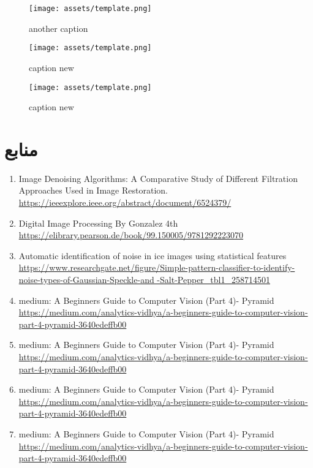 \documentclass[a4paper,12pt]{article}
\begin{document}
	\begin{figure}[ht]
		\centering
		\begin{minipage}[t]{0.32\textwidth}
			\centering
			\texttt{[image: assets/template.png]}
			\caption{\textcolor{CustomAccent}{another caption}}
		\end{minipage}
		\hfill
		\begin{minipage}[t]{0.32\textwidth}
			\centering
			\texttt{[image: assets/template.png]}
			\caption{\textcolor{CustomAccent}{caption new}}
		\end{minipage}
		\vspace{1em}
		\hfill
		\begin{minipage}[t]{0.32\textwidth}
			\centering
			\texttt{[image: assets/template.png]}
			\caption{\textcolor{CustomAccent}{caption new}}
		\end{minipage}
		\vspace{1em}
	\end{figure}
	
	
	
\clearpage
\section*{منابع}

\begin{LTR}
	\begin{latin}
		\begin{enumerate}[left=0pt,labelsep=5pt,itemsep=0pt,parsep=0pt,topsep=0pt]
			\item Image Denoising Algorithms: A Comparative Study of Different Filtration Approaches Used in Image Restoration.  \url{https://ieeexplore.ieee.org/abstract/document/6524379/}
			\item Digital Image Processing By Gonzalez 4th  \url{https://elibrary.pearson.de/book/99.150005/9781292223070}
			\item Automatic identification of noise in ice images using statistical features \url{https://www.researchgate.net/figure/Simple-pattern-classifier-to-identify-noise-types-of-Gaussian-Speckle-and -Salt-Pepper_tbl1_258714501}
			\item medium: A Beginners Guide to Computer Vision (Part 4)- Pyramid \url{https://medium.com/analytics-vidhya/a-beginners-guide-to-computer-vision-part-4-pyramid-3640edeffb00}
			
			
			\item medium: A Beginners Guide to Computer Vision (Part 4)- Pyramid \url{https://medium.com/analytics-vidhya/a-beginners-guide-to-computer-vision-part-4-pyramid-3640edeffb00}
			\item medium: A Beginners Guide to Computer Vision (Part 4)- Pyramid \url{https://medium.com/analytics-vidhya/a-beginners-guide-to-computer-vision-part-4-pyramid-3640edeffb00}
			\item medium: A Beginners Guide to Computer Vision (Part 4)- Pyramid \url{https://medium.com/analytics-vidhya/a-beginners-guide-to-computer-vision-part-4-pyramid-3640edeffb00}
			
		\end{enumerate}
	\end{latin}
\end{LTR}
\end{document}
